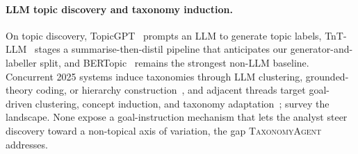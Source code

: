 \paragraph{LLM topic discovery and taxonomy induction.}
On topic discovery, TopicGPT~\citep{pham2024topicgpt} prompts an LLM to
generate topic labels, TnT-LLM~\citep{wan2024tntllm} stages a
summarise-then-distil pipeline that anticipates our
generator-and-labeller split, and
BERTopic~\citep{grootendorst2022bertopic} remains the strongest non-LLM
baseline. Concurrent 2025 systems induce taxonomies through LLM
clustering, grounded-theory coding, or hierarchy
construction~\citep{brady2025iterativetax, pi2025logos,
zhu2025contextawaretax, yang2025llmitl, huang2025clustasclass}, and
adjacent threads target goal-driven clustering, concept induction, and
taxonomy adaptation~\citep{wang2023goalex, lam2024lloom, taxoadapt2025,
llmguided2025}; \citet{tan2024llmannot} survey the landscape. None expose
a goal-instruction mechanism that lets the analyst steer discovery toward
a non-topical axis of variation, the gap \textsc{TaxonomyAgent} addresses.
